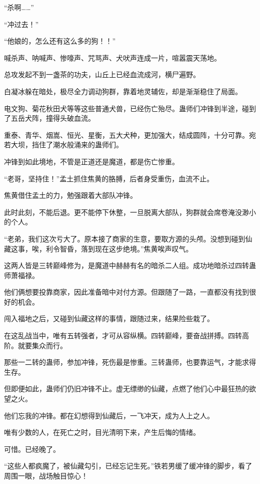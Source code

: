 
\begin{this_body}

“杀啊……”

“冲过去！”

“他娘的，怎么还有这么多的狗！！”

喊杀声、呐喊声、惨嚎声、咒骂声、犬吠声连成一片，喧嚣震天荡地。

总攻发起不到一盏茶的功夫，山丘上已经血流成河，横尸遍野。

白凝冰躲在暗处，极尽全力调动狗群，靠着地灵辅佐，却是渐渐稳住了局面。

电文狗、菊花秋田犬等等这些普通犬兽，已经伤亡殆尽。蛊师们冲锋到半途，碰到了五岳犬阵，撞得头破血流。

重泰、青华、烟嵩、恒光、星衡，五大犬种，更加强大，结成圆阵，十分可靠。宛若大坝，挡住了潮水般涌来的蛊师们。

冲锋到如此境地，不管是正道还是魔道，都是伤亡惨重。

“老哥，坚持住！”孟土抓住焦黄的胳膊，后者身受重伤，血流不止。

焦黄借住孟土的力，勉强跟着大部队冲锋。

此时此刻，不能后退。更不能停下休整，一旦脱离大部队，狗群就会席卷淹没渺小的个人。

“老弟，我们这次亏大了。原本接了商家的生意，要取方源的头颅。没想到碰到仙藏这事，唉，利令智昏，落到现在这步绝境。”焦黄唉声叹气。

这两人皆是三转巅峰修为，是魔道中赫赫有名的暗杀二人组。成功地暗杀过四转蛊师萧福禄。

他们俩想要投靠商家，因此准备暗中对付方源。但跟随了一路，一直都没有找到很好的机会。

闯入福地之后，又碰到仙藏这样的事情，跟随过来，结果险些栽了。

在这乱战当中，唯有五转强者，才可从容纵横。四转巅峰，要奋战拼搏。四转高阶。就要集众而行。

那些一二转的蛊师，参加冲锋，死伤最是惨重。三转蛊师，也要靠运气，才能求得生存。

但即便如此，蛊师们仍旧冲锋不止。虚无缥缈的仙藏，点燃了他们心中最狂热的欲望之火。

他们忘我的冲锋。都在幻想得到仙藏后，一飞冲天，成为人上之人。

唯有少数的人，在死亡之时，目光清明下来，产生后悔的情绪。

可惜。已经晚了。

“这些人都疯魔了，被仙藏勾引，已经忘记生死。”铁若男缓了缓冲锋的脚步，看了周围一眼，战场触目惊心！


\end{this_body}
